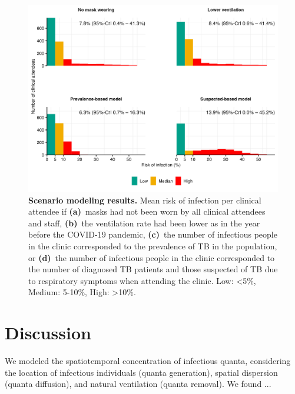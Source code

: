 \documentclass[fleqn,11pt]{wlscirep}
\begin{document}
\begin{figure}
    \centering
    \includegraphics{results/modeling/mean-roi-comparison.png}
    \caption{\textbf{Scenario modeling results.} Mean risk of infection per clinical attendee if \textbf{(a)}~masks had not been worn by all clinical attendees and staff, \textbf{(b)}~the ventilation rate had been lower as in the year before the COVID-19 pandemic, \textbf{(c)}~the number of infectious people in the clinic corresponded to the prevalence of TB in the population, or \textbf{(d)}~the number of infectious people in the clinic corresponded to the number of diagnosed TB patients and those suspected of TB due to respiratory symptoms when attending the clinic. Low: <5\%, Medium: 5-10\%, High: >10\%.}
    \label{fig:scenario-results}
\end{figure}


\FloatBarrier

\newpage

\section{Discussion}

We modeled the spatiotemporal concentration of infectious quanta, considering the location of infectious individuals (quanta generation), spatial dispersion (quanta diffusion), and natural ventilation (quanta removal). We found ... 


\end{document}
